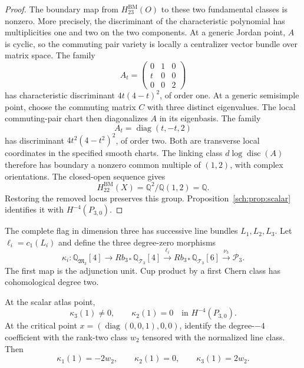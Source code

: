 \begin{proof}
The boundary map from $H^{\mathrm{BM}}_{23}(O)$ to these two
fundamental classes is nonzero. More precisely, the discriminant
of the characteristic polynomial has multiplicities one and two
on the two components. At a generic Jordan point, $A$ is cyclic,
so the commuting pair variety is locally a centralizer vector bundle
over matrix space. The family
\[
 A_t=\begin{pmatrix}0&1&0\\t&0&0\\0&0&2\end{pmatrix}
\]
has characteristic discriminant $4t(4-t)^2$, of order one.
At a generic semisimple point, choose the commuting matrix $C$
with three distinct eigenvalues. The local commuting-pair chart then
diagonalizes $A$ in its eigenbasis. The family
\[
 A_t=\operatorname{diag}(t,-t,2)
\]
has discriminant $4t^2(4-t^2)^2$, of order two.
Both are transverse local coordinates in the specified smooth charts.
The linking class $d\log\operatorname{disc}(A)$ therefore has
boundary a nonzero common multiple of $(1,2)$, with complex orientations.
The closed-open sequence gives
\[
 H^{\mathrm{BM}}_{22}(X)
       =\mathbb Q^2/\mathbb Q(1,2)=\mathbb Q.
\]
Restoring the removed locus preserves this group.
Proposition~\ref{sch:prop:scalar} identifies it with
$H^{-4}(P_{3,0})$.
\end{proof}

The complete flag in dimension three has successive line bundles
$L_1,L_2,L_3$. Let $\ell_i=c_1(L_i)$ and define the three
degree-zero morphisms
\[
 \kappa_i:\mathbb Q_{\mathfrak M_3}[4]
   \longrightarrow Rb_{3*}\mathbb Q_{\mathcal T_3}[4]
   \xrightarrow{\ \ell_i\ }Rb_{3*}\mathbb Q_{\mathcal T_3}[6]
   \xrightarrow{\nu_3}\mathcal P_3.
\]
The first map is the adjunction unit. Cup product by a first Chern
class has cohomological degree two.

\begin{lemma}
\label{sch:lem:three-decorations}
At the scalar atlas point,
\[
 \kappa_3(1)\ne0,\qquad \kappa_2(1)=0
                    \quad\text{in }H^{-4}(P_{3,0}).
\]
At the critical point
$x=(\operatorname{diag}(0,0,1),0,0)$, identify the degree-$-4$
coefficient with the rank-two class $w_2$ tensored with the
normalized line class. Then
\[
 \kappa_1(1)=-2w_2,\qquad \kappa_2(1)=0,
 \qquad \kappa_3(1)=2w_2.
\]
\end{lemma}

